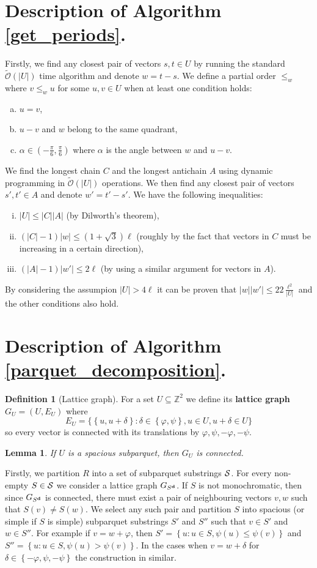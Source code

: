 \documentclass[11pt]{article}
\newcommand{\Z}{\mathbb{Z}}
\newcommand{\tO}{\tilde{\mathcal{O}}}
\renewcommand{\phi}{\varphi}
\newcommand{\set}[1]{\left\lbrace #1 \right\rbrace}
\newcommand{\bigset}[1]{\big \lbrace #1 \big \rbrace}
\theoremstyle{plain}
\newtheorem{lemma}{Lemma}
\theoremstyle{definition}
\newtheorem{definition}{Definition}
\begin{document}
\section{Description of Algorithm \ref{get_periods}.}
Firstly, we find any closest pair of vectors $s, t \in U$ by running the standard $\tO(|U|)$ time algorithm and denote $w = t - s$.
We define a partial order $\le_{w}$ where $v \le_w u$ for some $u, v \in U$ when at least one condition holds:
\begin{enumerate}[(a)]
	\item $u = v$,
	\item $u - v$ and $w$ belong to the same quadrant,
	\item $\alpha \in (-\frac{\pi}{6}, \frac{\pi}{6})$ where $\alpha$ is the angle between $w$ and $u - v$.
\end{enumerate}
We find the longest chain $C$ and the longest antichain $A$ using dynamic programming in $\tO(|U|)$ operations.
We then find any closest pair of vectors $s', t' \in A$ and denote $w' = t' - s'$.
We have the following inequalities:
\begin{enumerate}[(i)]
	\item $|U| \le |C| |A|$ (by Dilworth's theorem),
	\item $(|C| - 1) |w| \le (1 + \sqrt{3})\ell$ (roughly by the fact that vectors in $C$ must be increasing in a certain direction), 
	\item $(|A| - 1) |w'| \le 2 \ell$ (by using a similar argument for vectors in $A$).
\end{enumerate}
By considering the assumpion $|U| > 4\ell$ it can be proven that $|w||w'| \le 22 \frac{\ell^2}{|U|}$ and the other conditions also hold.


\section{Description of Algorithm \ref{parquet_decomposition}.}
\begin{definition}[Lattice graph]
	For a set $U \subseteq \Z^2$ we define its \textbf{lattice graph} $G_U = (U, E_U)$ where
	$$ E_U = \bigset{\set{u, u + \delta} : \delta \in \set{\phi, \psi}, u \in U, u + \delta \in U} $$ 
	so every vector is connected with its translations by $\phi, \psi, -\phi, -\psi$.
\end{definition}
\begin{lemma}
	If $U$ is a spacious subparquet, then $G_U$ is connected.
\end{lemma}
Firstly, we partition $R$ into a set of subparquet substrings $\S$.
For every non-empty $S \in \S$ we consider a lattice graph $G_{\d{S}}$. If $S$ is not monochromatic, then since $G_{\d{S}}$ is connected, there must exist a pair of neighbouring vectors $v, w$ such that $S(v) \neq S(w)$.
We select any such pair and partition $S$ into spacious (or simple if $S$ is simple) subparquet substrings $S'$ and $S''$ such that $v \in S'$ and $w \in S''$.
For example if $v = w + \phi$, then $S' = \set{u : u \in S, \psi(u) \le \psi(v)}$ and $S'' = \set{u : u \in S, \psi(u) > \psi(v)}$.
In the cases when $v = w + \delta$ for $\delta \in \set{-\phi, \psi, -\psi}$ the construction in similar.
\end{document}
